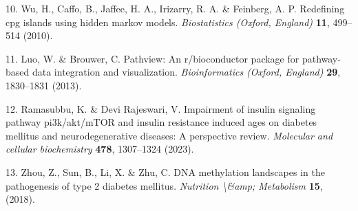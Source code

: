 \documentclass[
]{article}
\newenvironment{cslreferences}%
  {}%
  {\par}
\begin{document}
\begin{cslreferences}
\leavevmode\hypertarget{ref-RedefiningCpgWuHa2010}{}%
10. Wu, H., Caffo, B., Jaffee, H. A., Irizarry, R. A. \& Feinberg, A. P. Redefining cpg islands using hidden markov models. \emph{Biostatistics (Oxford, England)} \textbf{11}, 499--514 (2010).

\leavevmode\hypertarget{ref-PathviewAnRLuoW2013}{}%
11. Luo, W. \& Brouwer, C. Pathview: An r/bioconductor package for pathway-based data integration and visualization. \emph{Bioinformatics (Oxford, England)} \textbf{29}, 1830--1831 (2013).

\leavevmode\hypertarget{ref-ImpairmentOfIRamasu2023}{}%
12. Ramasubbu, K. \& Devi Rajeswari, V. Impairment of insulin signaling pathway pi3k/akt/mTOR and insulin resistance induced ages on diabetes mellitus and neurodegenerative diseases: A perspective review. \emph{Molecular and cellular biochemistry} \textbf{478}, 1307--1324 (2023).

\leavevmode\hypertarget{ref-DnaMethylationZhou2018}{}%
13. Zhou, Z., Sun, B., Li, X. \& Zhu, C. DNA methylation landscapes in the pathogenesis of type 2 diabetes mellitus. \emph{Nutrition \textbackslash\&amp; Metabolism} \textbf{15}, (2018).
\end{cslreferences}
\end{document}
